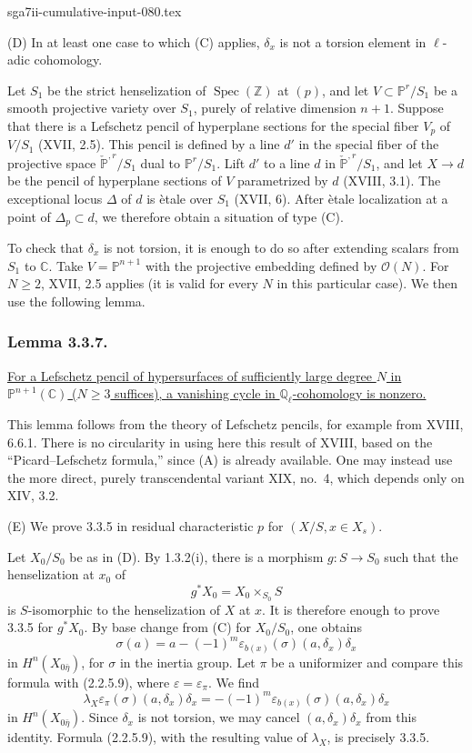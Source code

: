 \begin{filecontents*}{sga7ii-cumulative-input-080.tex}
\par\medskip
\noindent\textup{(D)}
In at least one case to which (C) applies, $\delta_x$ is not a torsion
element in $\ell$-adic cohomology.

Let $S_1$ be the strict henselization of
$\operatorname{Spec}(\mathbb Z)$ at $(p)$, and let
$V\subset\mathbb P^r/S_1$ be a smooth projective variety over $S_1$,
purely of relative dimension $n+1$.  Suppose that there is a
Lefschetz pencil of hyperplane sections for the special fiber $V_p$
of $V/S_1$ (XVII, 2.5).  This pencil is defined by a line $d'$ in the
special fiber of the projective space $\check{\mathbb P}^{,r}/S_1$
dual to $\mathbb P^r/S_1$.  Lift $d'$ to a line $d$ in
$\check{\mathbb P}^{,r}/S_1$, and let $X\to d$ be the pencil of
hyperplane sections of $V$ parametrized by $d$ (XVIII, 3.1).  The
exceptional locus $\Delta$ of $d$ is \`etale over $S_1$ (XVII, 6).
After \`etale localization at a point of $\Delta_p\subset d$, we
therefore obtain a situation of type (C).

To check that $\delta_x$ is not torsion, it is enough to do so after
extending scalars from $S_1$ to $\mathbb C$.  Take
$V=\mathbb P^{n+1}$ with the projective embedding defined by
$\mathcal O(N)$.  For $N\ge2$, XVII, 2.5 applies (it is valid for
every $N$ in this particular case).  We then use the following lemma.

\subsubsection*{Lemma 3.3.7.}
\underline{For a Lefschetz pencil of hypersurfaces of sufficiently
large degree $N$ in $\mathbb P^{n+1}(\mathbb C)$ ($N\ge3$ suffices),
a vanishing cycle in $\mathbb Q_\ell$-cohomology is nonzero.}

This lemma follows from the theory of Lefschetz pencils, for example
from XVIII, 6.6.1.  There is no circularity in using here this result
of XVIII, based on the ``Picard--Lefschetz formula,'' since (A) is
already available.  One may instead use the more direct, purely
transcendental variant XIX, no.~4, which depends only on XIV, 3.2.

\medskip
\noindent\textup{(E)}
We prove 3.3.5 in residual characteristic $p$ for
$(X/S,x\in X_s)$.

Let $X_0/S_0$ be as in (D).  By 1.3.2(i), there is a morphism
$g:S\to S_0$ such that the henselization at $x_0$ of
\[
g^*X_0=X_0\times_{S_0}S
\]
is $S$-isomorphic to the henselization of $X$ at $x$.  It is
therefore enough to prove 3.3.5 for $g^*X_0$.  By base change from
(C) for $X_0/S_0$, one obtains
\[
\sigma(a)=a-(-1)^m
\varepsilon_{b(x)}(\sigma)(a,\delta_x)\delta_x
\]
in $H^n(X_{0\bar\eta})$, for $\sigma$ in the inertia group.  Let
$\pi$ be a uniformizer and compare this formula with (2.2.5.9), where
$\varepsilon=\varepsilon_\pi$.  We find
\[
\lambda_X\varepsilon_\pi(\sigma)(a,\delta_x)\delta_x
=-(-1)^m\varepsilon_{b(x)}(\sigma)(a,\delta_x)\delta_x
\]
in $H^n(X_{0\bar\eta})$.  Since $\delta_x$ is not torsion, we may
cancel $(a,\delta_x)\delta_x$ from this identity.  Formula (2.2.5.9),
with the resulting value of $\lambda_X$, is precisely 3.3.5.


\end{filecontents*}
